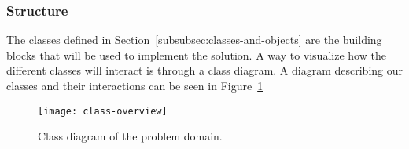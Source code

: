 \subsubsection{Structure}\label{subsubsec:structure}

The classes defined in Section~\ref{subsubsec:classes-and-objects} are the building blocks that will be used
to implement the solution.
A way to visualize how the different classes will interact is through a class diagram.
A diagram describing our classes and their interactions can be seen in Figure~\ref{fig:pda-class-diagram}

\begin{figure}[H]
    \centering
    \texttt{[image: class-overview]}
    \caption{Class diagram of the problem domain.
    }\label{fig:pda-class-diagram}
\end{figure}
